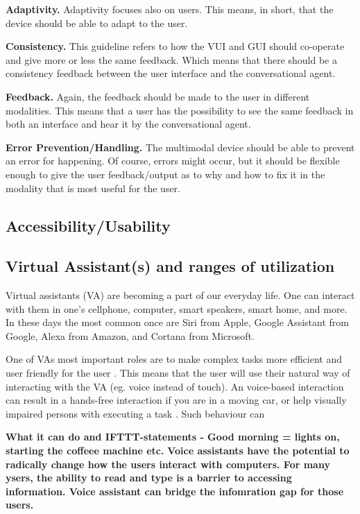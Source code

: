 \textbf{Adaptivity.} 
Adaptivity focuses also on users. This means, in short, that the device should be able to adapt to the user. 

\textbf{Consistency.} 
This guideline refers to how the VUI and GUI should co-operate and give more or less the same feedback. Which means that there should be a consistency feedback between the user interface and the conversational agent. 

\textbf{Feedback.} 
Again, the feedback should be made to the user in different modalities. This means that a user has the possibility to see the same feedback in both an interface and hear it by the conversational agent. 

\textbf{Error Prevention/Handling.} 
The multimodal device should be able to prevent an error for happening. Of course, errors might occur, but it should be flexible enough to give the user feedback/output as to why and how to fix it in the modality that is most useful for the user. 

\subsection{Accessibility/Usability}

\subsection{Virtual Assistant(s) and ranges of utilization}
Virtual assistants (VA) are becoming a part of our everyday life. One can interact with them in one's cellphone, computer, smart speakers, smart home, and more. In these days the most common once are Siri from Apple, Google Assistant from Google, Alexa from Amazon, and Cortana from Microsoft. \cite{Berdasco.A, Hoy.M} %

One of VAs most important roles are to make complex tasks more efficient and user friendly for the user \cite{Corbett.E}. This means that the user will use their natural way of interacting with the VA (eg. voice instead of touch)\cite{Neto.AT}. An voice-based interaction can result in a hands-free interaction if you are in a moving  car, or help visually impaired persons with executing a task \cite{pyae.a} 
. Such behaviour can %

\textbf{ What it can do and IFTTT-statements - Good morning = lights on, starting the coffeee machine etc.} 
\textbf{Voice assistants have the potential to radically change how the users interact with computers. For many ysers, the ability to read and type is a barrier to accessing information. Voice assistant can bridge the infomration gap for those users.}
\cite{Hoy.M}

